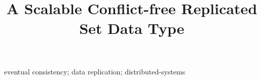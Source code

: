 \documentclass[10pt,conference,letterpaper]{IEEEtran}
\begin{document}
\title{A Scalable Conflict-free Replicated Set Data Type}

\author{
\and
{}
}

\maketitle


\begin{IEEEkeywords}
eventual consistency; data replication; distributed-systems
\end{IEEEkeywords}
\end{document}
